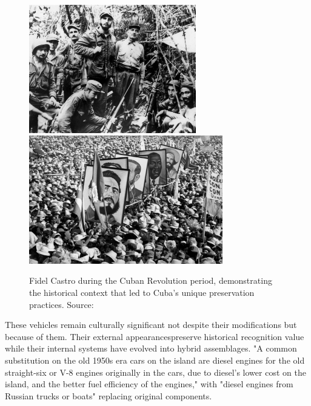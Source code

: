 \begin{figure}[H]
\centering
\includegraphics[height=5.6cm]{figures/chapter2/castro1.jpg}
\hspace{0.01cm}
\includegraphics[height=5.6cm]{figures/chapter2/castro2.jpg}
\caption{Fidel Castro during the Cuban Revolution period, demonstrating the historical context that led to Cuba's unique preservation practices. Source: \citet{castro_time_photos}}
\label{fig:castro_revolution}
\end{figure}

These vehicles remain culturally significant not despite their modifications but because of them. Their external appearancespreserve historical recognition value while their internal systems have evolved into hybrid assemblages. "A common substitution on the old 1950s era cars on the island are diesel engines for the old straight-six or V-8 engines originally in the cars, due to diesel's lower cost on the island, and the better fuel efficiency of the engines," \citep{diplomatictimes2019} with "diesel engines from Russian trucks or boats" \citep{diplomatictimes2019} replacing original components.


